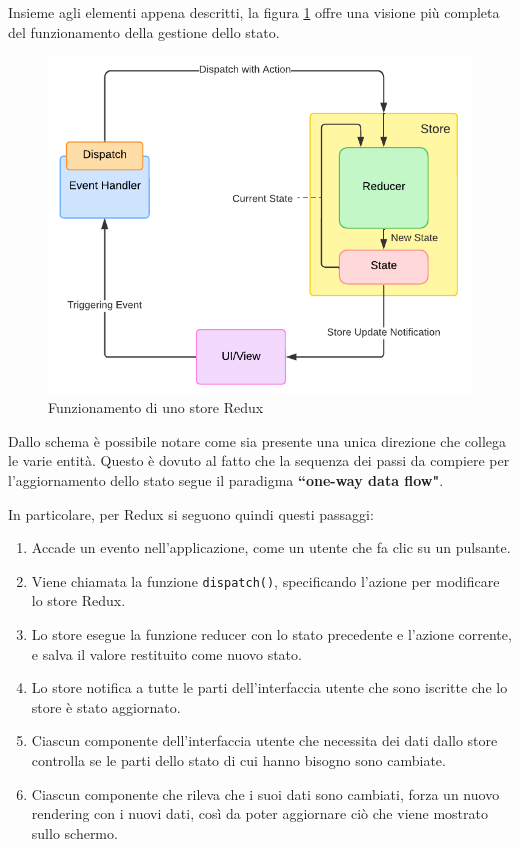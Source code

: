 Insieme agli elementi appena descritti, la figura \cref{fig:redux-scheme} offre una visione più completa del funzionamento della gestione dello stato.
\begin{figure}[htb]
	\centering
	\includegraphics[scale=0.8]{imgs/Redux_Scheme.pdf}
	\caption{Funzionamento di uno store Redux}
	\label{fig:redux-scheme}
\end{figure}
Dallo schema è possibile notare come sia presente una unica direzione che collega le varie entità. Questo è dovuto al fatto che la sequenza dei passi da compiere per l'aggiornamento dello stato segue il paradigma \textbf{``one-way data flow"}.

 In particolare, per Redux si seguono quindi questi passaggi:
\begin{enumerate}	
	\item Accade un evento nell'applicazione, come un utente che fa clic su un pulsante.
	\item Viene chiamata la funzione \texttt{dispatch()}, specificando l'azione per modificare lo store Redux.
	\item Lo store esegue la funzione reducer con lo stato precedente e l'azione corrente, e salva il valore restituito come nuovo stato.
	\item Lo store notifica a tutte le parti dell'interfaccia utente che sono iscritte che lo store è stato aggiornato.
	\item Ciascun componente dell'interfaccia utente che necessita dei dati dallo store controlla se le parti dello stato di cui hanno bisogno sono cambiate.
	\item Ciascun componente che rileva che i suoi dati sono cambiati, forza un nuovo rendering con i nuovi dati, così da poter aggiornare ciò che viene mostrato sullo schermo.
\end{enumerate}
